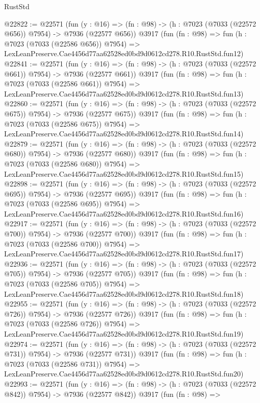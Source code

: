 \begin{lexlean}{RustStd}
\begin{coremodule}
@22822 := @22571
    (fun (y : @16) => (fn : @98) -> (h : @7023 (@7033 (@22572 @656)) @7954) -> @7936 (@22577 @656))
    @3917
    (fun (fn : @98) =>
    fun (h : @7023 (@7033 (@22586 @656)) @7954) =>
    LexLeanPreserve.Cae4456d77aa62528ed0bd9d0612cd278.R10.RustStd.fun12)
@22841 := @22571
    (fun (y : @16) => (fn : @98) -> (h : @7023 (@7033 (@22572 @661)) @7954) -> @7936 (@22577 @661))
    @3917
    (fun (fn : @98) =>
    fun (h : @7023 (@7033 (@22586 @661)) @7954) =>
    LexLeanPreserve.Cae4456d77aa62528ed0bd9d0612cd278.R10.RustStd.fun13)
@22860 := @22571
    (fun (y : @16) => (fn : @98) -> (h : @7023 (@7033 (@22572 @675)) @7954) -> @7936 (@22577 @675))
    @3917
    (fun (fn : @98) =>
    fun (h : @7023 (@7033 (@22586 @675)) @7954) =>
    LexLeanPreserve.Cae4456d77aa62528ed0bd9d0612cd278.R10.RustStd.fun14)
@22879 := @22571
    (fun (y : @16) => (fn : @98) -> (h : @7023 (@7033 (@22572 @680)) @7954) -> @7936 (@22577 @680))
    @3917
    (fun (fn : @98) =>
    fun (h : @7023 (@7033 (@22586 @680)) @7954) =>
    LexLeanPreserve.Cae4456d77aa62528ed0bd9d0612cd278.R10.RustStd.fun15)
@22898 := @22571
    (fun (y : @16) => (fn : @98) -> (h : @7023 (@7033 (@22572 @695)) @7954) -> @7936 (@22577 @695))
    @3917
    (fun (fn : @98) =>
    fun (h : @7023 (@7033 (@22586 @695)) @7954) =>
    LexLeanPreserve.Cae4456d77aa62528ed0bd9d0612cd278.R10.RustStd.fun16)
@22917 := @22571
    (fun (y : @16) => (fn : @98) -> (h : @7023 (@7033 (@22572 @700)) @7954) -> @7936 (@22577 @700))
    @3917
    (fun (fn : @98) =>
    fun (h : @7023 (@7033 (@22586 @700)) @7954) =>
    LexLeanPreserve.Cae4456d77aa62528ed0bd9d0612cd278.R10.RustStd.fun17)
@22936 := @22571
    (fun (y : @16) => (fn : @98) -> (h : @7023 (@7033 (@22572 @705)) @7954) -> @7936 (@22577 @705))
    @3917
    (fun (fn : @98) =>
    fun (h : @7023 (@7033 (@22586 @705)) @7954) =>
    LexLeanPreserve.Cae4456d77aa62528ed0bd9d0612cd278.R10.RustStd.fun18)
@22955 := @22571
    (fun (y : @16) => (fn : @98) -> (h : @7023 (@7033 (@22572 @726)) @7954) -> @7936 (@22577 @726))
    @3917
    (fun (fn : @98) =>
    fun (h : @7023 (@7033 (@22586 @726)) @7954) =>
    LexLeanPreserve.Cae4456d77aa62528ed0bd9d0612cd278.R10.RustStd.fun19)
@22974 := @22571
    (fun (y : @16) => (fn : @98) -> (h : @7023 (@7033 (@22572 @731)) @7954) -> @7936 (@22577 @731))
    @3917
    (fun (fn : @98) =>
    fun (h : @7023 (@7033 (@22586 @731)) @7954) =>
    LexLeanPreserve.Cae4456d77aa62528ed0bd9d0612cd278.R10.RustStd.fun20)
@22993 := @22571
    (fun (y : @16) => (fn : @98) -> (h : @7023 (@7033 (@22572 @842)) @7954) -> @7936 (@22577 @842))
    @3917
    (fun (fn : @98) =>

\end{coremodule}
\end{lexlean}
